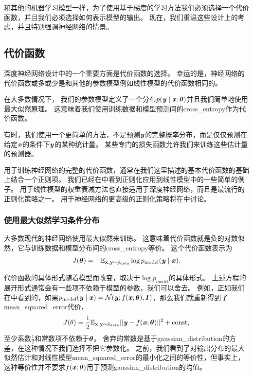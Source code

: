 和其他的机器学习模型一样，为了使用基于梯度的学习方法我们必须选择一个代价函数，并且我们必须选择如何表示模型的输出。
现在，我们重温这些设计上的考虑，并且特别强调神经网络的情景。

\subsection{代价函数}
\label{sec:cost_functions}

深度神经网络设计中的一个重要方面是代价函数的选择。
幸运的是，神经网络的代价函数或多或少是和其他的参数模型例如线性模型的代价函数相同的。

在大多数情况下， 我们的参数模型定义了一个分布$p(\boldsymbol{\mathit{y}}\mid\boldsymbol{\mathit{x}};\boldsymbol{\theta})$并且我们简单地使用最大似然原理。
这意味着我们使用训练数据和模型预测间的\gls{cross_entropy}作为代价函数。

有时，我们使用一个更简单的方法，不是预测$\boldsymbol{\mathit{y}}$的完整概率分布，而是仅仅预测在给定$\boldsymbol{\mathit{x}}$的条件下$\boldsymbol{\mathit{y}}$的某种统计量。
某些专门的损失函数允许我们来训练这些估计量的预测器。

用于训练神经网络的完整的代价函数，通常在我们这里描述的基本代价函数的基础上结合一个正则项。
我们已经在中看到正则化应用到线性模型中的一些简单的例子。
用于线性模型的权重衰减方法也直接适用于深度神经网络，而且是最流行的正则化策略之一。
用于神经网络的更高级的正则化策略将在中讨论。


\subsubsection{使用最大似然学习条件分布}
\label{sec:learning_conditional_distributions_with_maximum_likelihood}

大多数现代的神经网络使用最大似然来训练。
这意味着代价函数就是负的对数似然，它与训练数据和模型分布间的\gls{cross_entropy}等价。
这个代价函数表示为
\begin{equation}
J(\boldsymbol{\theta}) = -\mathbb{E}_{\mathbf{x}, \mathbf{y} \sim \hat{p}_\text{data}} \log p_\text{model} (\boldsymbol{\mathit{y}} \mid \boldsymbol{\mathit{x}}).
\end{equation}

代价函数的具体形式随着模型而改变，取决于$\log p_\text{model}$的具体形式。
上述方程的展开形式通常会有一些项不依赖于模型的参数，我们可以舍去。
例如，正如我们在中看到的，如果$p_\text{model}(\boldsymbol{\mathit{y}}\mid\boldsymbol{\mathit{x}}) = \mathcal{N}(\boldsymbol{\mathit{y}};f(\boldsymbol{\mathit{x}};\boldsymbol{\theta}), \boldsymbol{\mathit{I}})$，那么我们就重新得到了\gls{mean_squared_error}代价，
\begin{equation}
J(\theta) = \frac{1}{2} \mathbb{E}_{\mathbf{x}, \mathbf{y} \sim  \hat{p}_\text{data}} || \boldsymbol{\mathit{y}} - f(\boldsymbol{\mathit{x}}; \boldsymbol{\theta}) ||^2 + \text{const},
\end{equation}
至少系数$\frac{1}{2}$和常数项不依赖于$\boldsymbol{\theta}$。
舍弃的常数是基于\gls{gaussian_distribution}的方差，在这种情况下我们选择不把它参数化。
之前，我们看到了对输出分布的最大似然估计和对线性模型\gls{mean_squared_error}的最小化之间的等价性，但事实上，这种等价性并不要求$f(\boldsymbol{\mathit{x}}; \boldsymbol{\theta})$用于预测\gls{gaussian_distribution}的均值。

